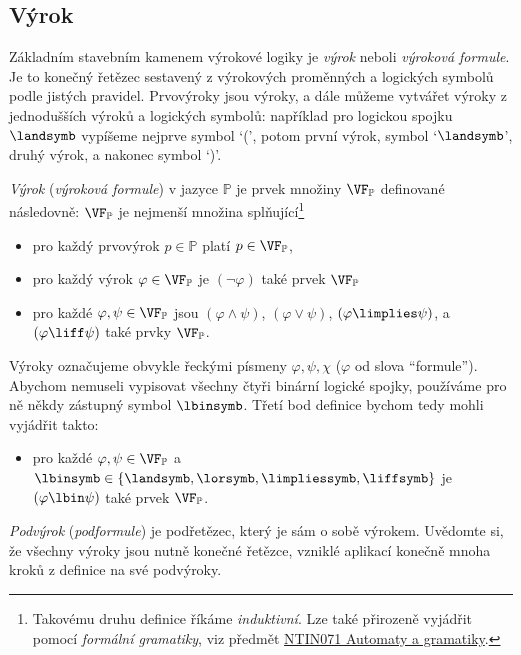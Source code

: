 \subsection{Výrok}

Základním stavebním kamenem výrokové logiky je \emph{výrok} neboli \emph{výroková formule}. Je to konečný řetězec sestavený z výrokových proměnných a logických symbolů podle jistých pravidel. Prvovýroky jsou výroky, a dále můžeme vytvářet výroky z jednodušších výroků a logických symbolů: například pro logickou spojku $\landsymb$ vypíšeme nejprve symbol `(', potom první výrok, symbol `$\landsymb$', druhý výrok, a nakonec symbol `)'.
\begin{definition}[Výrok]\label{definition:proposition}
    \emph{Výrok} (\emph{výroková formule}) v jazyce $\mathbb P$ je prvek množiny $\VF_\mathbb P$ definované následovně: $\VF_\mathbb P$ je nejmenší množina splňující\footnote{Takovému druhu definice říkáme \emph{induktivní}. Lze také přirozeně vyjádřit pomocí \emph{formální gramatiky}, viz předmět \href{https://is.cuni.cz/studium/predmety/index.php?do=predmet&kod=NTIN071}{NTIN071 Automaty a gramatiky}.}
    \begin{itemize}
        \item pro každý prvovýrok $p\in\mathbb P$ platí $p\in\VF_\mathbb P$,
        \item pro každý výrok $\varphi\in\VF_\mathbb P$ je $(\neg\varphi)$ také prvek $\VF_\mathbb P$
        \item pro každé $\varphi,\psi\in\VF_\mathbb P$ jsou $(\varphi\land\psi)$, $(\varphi\lor\psi)$, $(\varphi\limplies\psi)$, a $(\varphi\liff\psi)$ také prvky $\VF_\mathbb P$.
    \end{itemize}        
\end{definition}
Výroky označujeme obvykle řeckými písmeny $\varphi,\psi,\chi$ ($\varphi$ od slova ``formule''). Abychom nemuseli vypisovat všechny čtyři binární logické spojky, používáme pro ně někdy zástupný symbol $\lbinsymb$. Třetí bod definice bychom tedy mohli vyjádřit takto:
\begin{itemize}
    \item pro každé $\varphi,\psi\in\VF_\mathbb P$ a $\lbinsymb\in\{\landsymb,\lorsymb,\limpliessymb,\liffsymb\}$ je $(\varphi\lbin\psi)$ také prvek $\VF_\mathbb P$.
\end{itemize}  


\emph{Podvýrok} (\emph{podformule}) je podřetězec, který je sám o sobě výrokem. Uvědomte si, že všechny výroky jsou nutně konečné řetězce, vzniklé aplikací konečně mnoha kroků z definice na své podvýroky. 	

